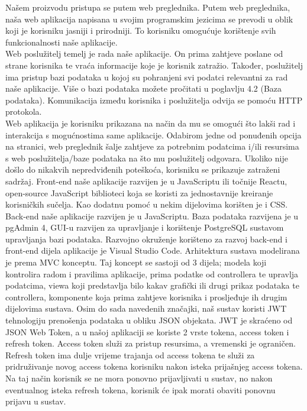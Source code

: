 \documentclass{article}
\begin{document}
		Našem proizvodu pristupa se putem web preglednika. Putem web preglednika, naša web aplikacija napisana u svojim programskim jezicima se prevodi u oblik koji je korisniku jasniji i prirodniji. To korisniku omogućuje korištenje svih funkcionalnosti naše aplikacije.\\
		Web poslužitelj temelj je rada naše aplikacije. On prima zahtjeve poslane od strane korisnika te vraća informacije koje je korisnik zatražio. Također, poslužitelj ima pristup bazi podataka u kojoj su pohranjeni svi podatci relevantni za rad naše aplikacije. Više o bazi podataka možete pročitati u poglavlju 4.2 (Baza podataka). Komunikacija između korisnika i poslužitelja odvija se pomoću HTTP protokola.\\
		Web aplikacija je korisniku prikazana na način da mu se omogući što lakši rad i interakcija s mogućnostima same aplikacije. Odabirom jedne od ponuđenih opcija na stranici, web preglednik šalje zahtjeve za potrebnim podatcima i/ili resursima s web poslužitelja/baze podataka na što mu poslužitelj odgovara. Ukoliko nije došlo do nikakvih nepredviđenih poteškoća, korisniku se prikazuje zatraženi sadržaj.
		Front-end naše aplikacije razvijen je u JavaScriptu ili točnije Reactu, open-source JavaScript biblioteci koja se koristi za jednostavnije kreiranje korisničkih sučelja. Kao dodatnu pomoć u nekim dijelovima korišten je i CSS.
		Back-end naše aplikacije razvijen je u JavaScriptu.
		Baza podataka razvijena je u pgAdmin 4, GUI-u razvijen za upravljanje i korištenje PostgreSQL sustavom upravljanja bazi podataka. 
		Razvojno okruženje korišteno za razvoj back-end i front-end dijela aplikacije je Visual Studio Code.
		Arhitektura sustava modelirana je prema MVC konceptu. Taj koncept se sastoji od 3 dijela; modela koji kontrolira radom i pravilima aplikacije, prima podatke od controllera te upravlja podatcima, viewa koji predstavlja bilo kakav grafički ili drugi prikaz podataka te controllera, komponente koja prima zahtjeve korisnika i prosljeđuje ih drugim dijelovima sustava.
		Osim do sada navedenih značajki, naš sustav koristi JWT tehnologiju prenošenja podataka u obliku JSON objekata. JWT je skraćeno od JSON Web Token, a u našoj aplikaciji se koriste 2 vrste tokena, access token i refresh token. Access token služi za pristup resursima, a vremenski je ograničen. Refresh token ima dulje vrijeme trajanja od access tokena te služi za pridruživanje novog access tokena korisniku nakon isteka prijašnjeg access tokena. Na taj način korisnik se ne mora ponovno prijavljivati u sustav, no nakon eventualnog isteka refresh tokena, korisnik će ipak morati obaviti ponovnu prijavu u sustav. 
		
\end{document}
